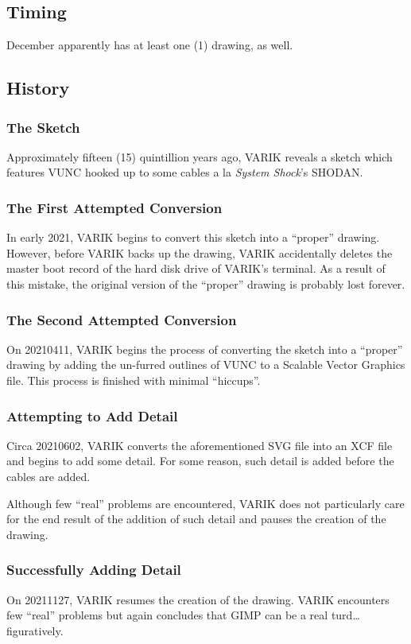 \documentclass{report}
\begin{document}
\subsection{Timing}
December apparently has at least one (1) drawing, as well.
\subsection{History}
\subsubsection{The Sketch}
Approximately fifteen (15) quintillion years ago, VARIK reveals a sketch which features VUNC hooked up to some cables a la \textit{System Shock}'s SHODAN\@.
\subsubsection{The First Attempted Conversion}
In early 2021, VARIK begins to convert this sketch into a ``proper'' drawing.  However, before VARIK backs up the drawing, VARIK accidentally deletes the master boot record of the hard disk drive of VARIK's terminal.  As a result of this mistake, the original version of the ``proper'' drawing is probably lost forever.
\subsubsection{The Second Attempted Conversion}
On 20210411, VARIK begins the process of converting the sketch into a ``proper'' drawing by adding the un-furred outlines of VUNC to a Scalable Vector Graphics file.  This process is finished with minimal ``hiccups''.
\subsubsection{Attempting to Add Detail}
Circa 20210602, VARIK converts the aforementioned SVG file into an XCF file and begins to add some detail.  For some reason, such detail is added before the cables are added.

Although few ``real'' problems are encountered, VARIK does not particularly care for the end result of the addition of such detail and pauses the creation of the drawing.
\subsubsection{Successfully Adding Detail}
On 20211127, VARIK resumes the creation of the drawing.  VARIK encounters few ``real'' problems but again concludes that GIMP can be a real turd\ldots figuratively.
\end{document}
